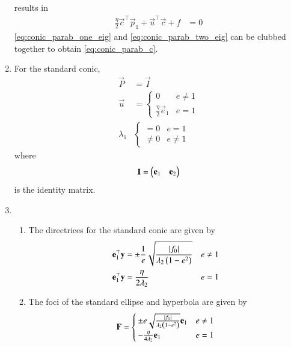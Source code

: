 \begin{enumerate}[label=\thesubsection.\arabic*.,ref=\thesubsection.\theenumi]
results in 
\begin{align}
\frac{\eta}{2}\vec{c}^{\top}\vec{p}_1 + \vec{u}^{\top}\vec{c} + f&= 0
\label{eq:conic_parab_two_eig}
\end{align}
\eqref{eq:conic_parab_one_eig} and \eqref{eq:conic_parab_two_eig} can be clubbed together to obtain \eqref{eq:conic_parab_c}.
\iffalse
			In 
			\eqref{eq:conic_affine}, substituting $\vec{y} = \vec{0}$, the center/vertex for the quadratic form is obtained as
    \begin{align}
	    \vec{x} = \vec{c}, 
    \end{align}
			where $\vec{c}$ is derived as 
    \eqref{eq:conic_nonparab_c}
    and 
    \eqref{eq:conic_parab_c}
in Appendix  \ref{app:parab}.
\fi
	  \item
		For the standard conic, 
				\begin{align}
					\label{eq:std-prm-P}
					\vec{P} &= \vec{I}
					\\
					\vec{u} &= 
				\begin{cases}
				0 & e \ne 1
       \\
				\frac{\eta}{2} \vec{e}_1 & e = 1
				\end{cases}
				\label{eq:std-prm-u}
				\\
				\lambda_1 &  
					\begin{cases}
						=0 & e = 1
						\\
						\ne 0 & e \ne 1
					\end{cases}
				\label{eq:std-prm-lam1}
				\end{align}
				where 
				\begin{align}
					\mathbf{I} = \begin{pmatrix}\mathbf{e}_1 & \mathbf{e}_2\end{pmatrix}
				\end{align}
				is the identity matrix.
	  
    \item\leavevmode
		\begin{enumerate}
			\item The directrices for the  standard conic are given by 
				\begin{align}
					\label{eq:dx-ell-hyp}
					\mathbf{e}_1^{\top}\mathbf{y} &=  
					\pm \frac{1}{e}\sqrt{\frac{\left\vert f_0\right\vert}{\lambda_2\left(1-e^2\right)}} & e \ne 1
					\\
					\mathbf{e}_1^{\top}\mathbf{y} &= \frac{\eta}{2\lambda_2} & e = 1
					\label{eq:dx-parab}
				\end{align}
    \item The foci of the standard ellipse and hyperbola are given by 
				\begin{align}
					\label{eq:F-ell-hyp-parab}
					\mathbf{F} 
=
					\begin{cases}
						\pm e\sqrt{\frac{\left\vert f_0\right\vert}{\lambda_2\left(1-e^2\right)}}\mathbf{e}_1 & e \ne 1
						\\
						 -\frac{\eta}{4\lambda_2}\mathbf{e}_1 & e = 1
					\end{cases}
				\end{align}
	

\end{enumerate}
\end{enumerate}
